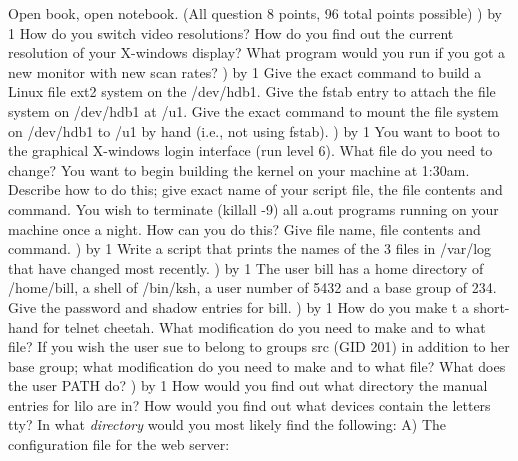 
\parindent=0in
\nopagenumbers
\newcount\quesno
{}
\def\ques{\number\quesno) \advance\quesno by 1}
\def\aspace{\vskip 1.5in}

Open book, open notebook. (All question 8 points, 96 total points possible)
\hfill\break
\ques
How do you switch video resolutions?
\vskip 0.4in
How do you find out the current resolution of your X-windows display?
\vskip 0.4in
What program would you run if you got a new monitor with new scan rates?
\vskip 0.4in
\ques
Give the exact command to build a Linux file ext2 system on the
{\ltt{}/dev/hdb1}.
\vskip 0.4in
Give the {\ltt{}fstab} entry to attach the file system
on {\ltt{}/dev/hdb1} at {\ltt{}/u1}.
\vskip 0.4in
Give the exact command to mount the file system on {\ltt{}/dev/hdb1}
to {\ltt{}/u1} by hand (i.e., not using {\ltt{}fstab}).
\vskip 0.4in
\ques
You want to boot to the graphical X-windows login interface (run level 6).
What file do you need to change?
\vskip 0.4in
You want to begin building the kernel on your machine at 1:30am.
Describe how to do this; give exact name of your script file, the file contents
and command.
\vskip 1.7in
You wish to terminate ({\ltt{}killall -9}) all {\ltt{}a.out} programs
running on your machine once a night.
How can you do this? Give file name, file contents and command.
\vskip 1.4in
\vfill\eject
\ques
Write a script that prints the names of the 3 files in {\ltt{}/var/log}
that have changed most recently.
\vskip 1.5in
\ques
The user {\ltt{}bill} has  a home directory of {\ltt{}/home/bill},
a shell of {\ltt{}/bin/ksh}, a user number of {\ltt{}5432}
and a base group of {\ltt{}234}.
Give the password and shadow entries for {\ltt{}bill}.
\vskip 1.4in
\ques
How do you make {\ltt{}t} a short-hand for {\ltt{}telnet cheetah}.
What modification do you need to make and to what file?
\vskip 1.0in
If you wish the user {\ltt{}sue} to belong to groups {\ltt{}src} (GID 201)
in addition to her base group;
what modification do you need to make and to what file?
\vskip 1.0in
What does the user PATH do?
\vskip 1.2in
\vfill\eject
\ques
How would you find out what directory the manual entries for {\ltt{}lilo}
are in?
\vskip 0.4in
How would you find out what devices contain the letters {\ltt{}tty}?
\vskip 0.4in
In what {\it directory} would you most likely find
the following:
\hfill\break
A) The configuration file for the web server:
